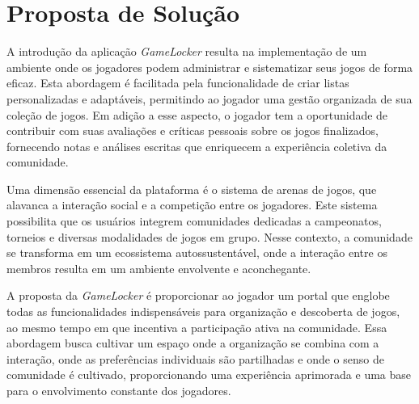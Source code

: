 \section{Proposta de Solução} 
\label{Proposta de Solução}

A introdução da aplicação \textit{GameLocker} resulta na implementação de um ambiente onde os jogadores podem administrar e sistematizar seus jogos de forma eficaz. Esta abordagem é facilitada pela funcionalidade de criar listas personalizadas e adaptáveis, permitindo ao jogador uma gestão organizada de sua coleção de jogos. Em adição a esse aspecto, o jogador tem a oportunidade de contribuir com suas avaliações e críticas pessoais sobre os jogos finalizados, fornecendo notas e análises escritas que enriquecem a experiência coletiva da comunidade.

Uma dimensão essencial da plataforma é o sistema de arenas de jogos, que alavanca a interação social e a competição entre os jogadores. Este sistema possibilita que os usuários integrem comunidades dedicadas a campeonatos, torneios e diversas modalidades de jogos em grupo. Nesse contexto, a comunidade se transforma em um ecossistema autossustentável, onde a interação entre os membros resulta em um ambiente envolvente e aconchegante.

A proposta da \textit{GameLocker} é proporcionar ao jogador um portal que englobe todas as funcionalidades indispensáveis para organização e descoberta de jogos, ao mesmo tempo em que incentiva a participação ativa na comunidade. Essa abordagem busca cultivar um espaço onde a organização se combina com a interação, onde as preferências individuais são partilhadas e onde o senso de comunidade é cultivado, proporcionando uma experiência aprimorada e uma base para o envolvimento constante dos jogadores.